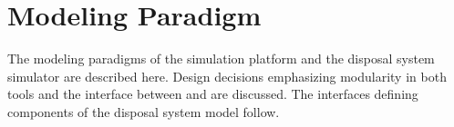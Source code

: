 \chapter{Modeling Paradigm}\label{ch:paradigm}

The modeling paradigms of the \Cyclus simulation platform and the \Cyder 
disposal system simulator are described here. Design decisions emphasizing 
modularity in both tools and the interface between \Cyclus and \Cyder are 
discussed. The interfaces defining components of the \Cyder disposal system 
model follow. 




